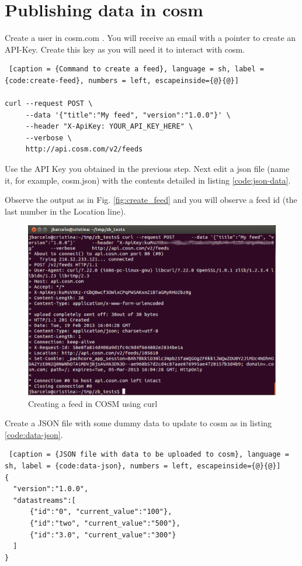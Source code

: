 \chapter{Publishing data in cosm}

Create a user in cosm.com .
You will receive an email with a pointer to create an API-Key.
Create this key as you will need it to interact with cosm.

\begin{lstlisting} [caption = {Command to create a feed}, language = sh, label = {code:create-feed}, numbers = left, escapeinside={@}{@}]

curl --request POST \
     --data '{"title":"My feed", "version":"1.0.0"}' \
     --header "X-ApiKey: YOUR_API_KEY_HERE" \
     --verbose \
     http://api.cosm.com/v2/feeds

\end{lstlisting}

Use the API Key you obtained in the previous step.
Next edit a json file (name it, for example, cosm.json) with the contents detailed in listing \ref{code:json-data}.

Observe the output as in Fig. \ref{fig:create_feed} and you will observe a feed id (the last number in the Location line).

\begin{figure}[htbp]
  \centering
  \includegraphics[width=0.9\linewidth]{figures/create-feed.eps}
  \caption{Creating a feed in COSM using curl}
  \label{fig:create-feed}
\end{figure}

Create a JSON file with some dummy data to update to cosm as in listing \ref{code:data-json}.

\begin{lstlisting} [caption = {JSON file with data to be uploaded to cosm}, language = sh, label = {code:data-json}, numbers = left, escapeinside={@}{@}]
{
  "version":"1.0.0",
  "datastreams":[
      {"id":"0", "current_value":"100"},
      {"id":"two", "current_value":"500"},
      {"id":"3.0", "current_value":"300"}
  ]
}
\end{lstlisting}

